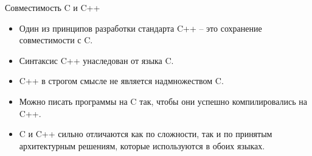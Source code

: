 \documentclass[9pt]{beamer}
\begin{document}
\begin{frame}{Совместимость C и C++}
    \begin{itemize}
        \item Один из принципов разработки стандарта C++ – это
        сохранение совместимости с C.
        \item Синтаксис C++ унаследован от языка C.
        \item C++ в строгом смысле не является надмножеством C.
        \item Можно писать программы на C так, чтобы они успешно
        компилировались на C++.
        \item C и C++ сильно отличаются как по сложности, так и по принятым архитектурным решениям, которые используются
        в обоих языках.
    \end{itemize}    
\end{frame}
\end{document}
